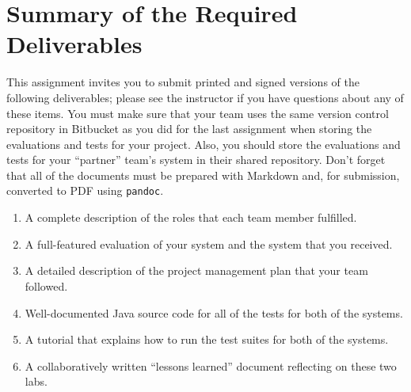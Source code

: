 

\section*{Summary of the Required Deliverables}

This assignment invites you to submit printed and signed versions of the following deliverables; please see the
instructor if you have questions about any of these items. You must make sure that your team uses the same version
control repository in Bitbucket as you did for the last assignment when storing the evaluations and tests for your
project.  Also, you should store the evaluations and tests for your ``partner'' team's system in their shared
repository.  Don't forget that all of the documents must be prepared with Markdown and, for submission, converted to PDF
using {\tt pandoc}.

\vspace*{-.1in}
\begin{enumerate}
  \setlength{\itemsep}{0in}
  \item A complete description of the roles that each team member fulfilled.
  \item A full-featured evaluation of your system and the system that you received.
  \item A detailed description of the project management plan that your team followed.
  \item Well-documented Java source code for all of the tests for both of the systems.
  \item A tutorial that explains how to run the test suites for both of the systems.
  \item A collaboratively written ``lessons learned'' document reflecting on these two labs.
\end{enumerate}
\vspace*{-.1in}


